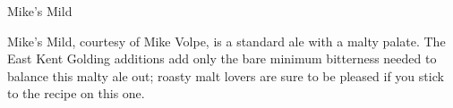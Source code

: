 \begin{recipie}{Mike's Mild}

\begin{aboutblock}
Mike's Mild, courtesy of Mike Volpe, is a standard ale with a malty palate. The
East Kent Golding additions add only the bare minimum bitterness needed to balance
this malty ale out; roasty malt lovers are sure to be pleased if you stick to
the recipe on this one.
\end{aboutblock}


\begin{methodandtiming}
 
\begin{mashsteps}
\end{mashsteps}

\begin{fermentationsteps}
\end{fermentationsteps}

\end{methodandtiming}

\pagebreak

\begin{ingredientsblock}

\begin{malts}
\end{malts}

\begin{hops}
\end{hops}

\begin{yeasts}
\end{yeasts}

\end{ingredientsblock}

\end{recipie}
